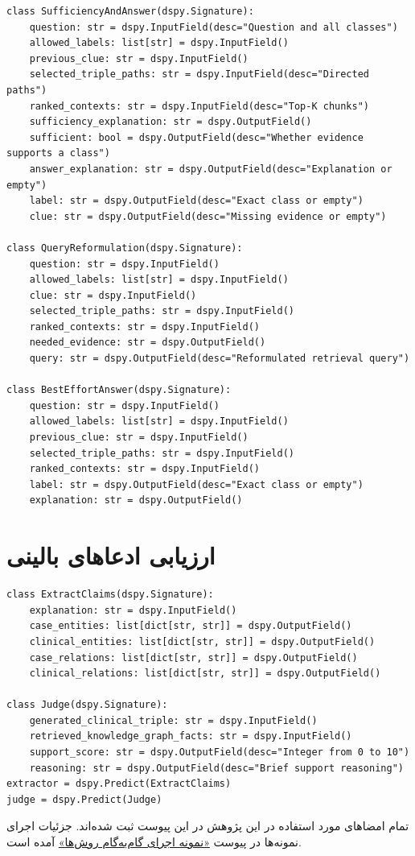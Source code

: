 \begin{latin}\footnotesize\begin{verbatim}
class SufficiencyAndAnswer(dspy.Signature):
    question: str = dspy.InputField(desc="Question and all classes")
    allowed_labels: list[str] = dspy.InputField()
    previous_clue: str = dspy.InputField()
    selected_triple_paths: str = dspy.InputField(desc="Directed paths")
    ranked_contexts: str = dspy.InputField(desc="Top-K chunks")
    sufficiency_explanation: str = dspy.OutputField()
    sufficient: bool = dspy.OutputField(desc="Whether evidence supports a class")
    answer_explanation: str = dspy.OutputField(desc="Explanation or empty")
    label: str = dspy.OutputField(desc="Exact class or empty")
    clue: str = dspy.OutputField(desc="Missing evidence or empty")

class QueryReformulation(dspy.Signature):
    question: str = dspy.InputField()
    allowed_labels: list[str] = dspy.InputField()
    clue: str = dspy.InputField()
    selected_triple_paths: str = dspy.InputField()
    ranked_contexts: str = dspy.InputField()
    needed_evidence: str = dspy.OutputField()
    query: str = dspy.OutputField(desc="Reformulated retrieval query")

class BestEffortAnswer(dspy.Signature):
    question: str = dspy.InputField()
    allowed_labels: list[str] = dspy.InputField()
    previous_clue: str = dspy.InputField()
    selected_triple_paths: str = dspy.InputField()
    ranked_contexts: str = dspy.InputField()
    label: str = dspy.OutputField(desc="Exact class or empty")
    explanation: str = dspy.OutputField()
\end{verbatim}
\end{latin}

\section{ارزیابی ادعاهای بالینی}
\begin{latin}\footnotesize\begin{verbatim}
class ExtractClaims(dspy.Signature):
    explanation: str = dspy.InputField()
    case_entities: list[dict[str, str]] = dspy.OutputField()
    clinical_entities: list[dict[str, str]] = dspy.OutputField()
    case_relations: list[dict[str, str]] = dspy.OutputField()
    clinical_relations: list[dict[str, str]] = dspy.OutputField()

class Judge(dspy.Signature):
    generated_clinical_triple: str = dspy.InputField()
    retrieved_knowledge_graph_facts: str = dspy.InputField()
    support_score: str = dspy.OutputField(desc="Integer from 0 to 10")
    reasoning: str = dspy.OutputField(desc="Brief support reasoning")
extractor = dspy.Predict(ExtractClaims)
judge = dspy.Predict(Judge)
\end{verbatim}
\end{latin}

تمام امضاهای  مورد استفاده در این پژوهش در این پیوست ثبت شده‌اند. جزئیات اجرای نمونه‌ها در پیوست \hyperref[app:step-by-step]{«نمونه اجرای گام‌به‌گام روش‌ها»} آمده است.
